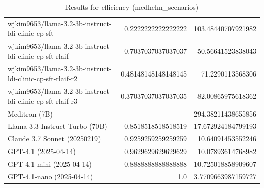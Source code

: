 \begin{table}[htp]
{\begin{tabular}{lrr}
wjkim9653/llama-3.2-3b-instruct-ldi-clinic-cp-sft & 0.2222222222222222 & 103.48440707921982 \\
wjkim9653/llama-3.2-3b-instruct-ldi-clinic-cp-sft-rlaif & 0.7037037037037037 & 50.56641523838043 \\
wjkim9653/llama-3.2-3b-instruct-ldi-clinic-cp-sft-rlaif-r2 & 0.48148148148148145 & 71.2290113568306 \\
wjkim9653/llama-3.2-3b-instruct-ldi-clinic-cp-sft-rlaif-r3 & 0.37037037037037035 & 82.00865975618362 \\
Meditron (7B) &  & 294.38211438655856 \\
Llama 3.3 Instruct Turbo (70B) & 0.8518518518518519 & 17.672924184799193 \\
Claude 3.7 Sonnet (20250219) & 0.9259259259259259 & 10.64091453552246 \\
GPT-4.1 (2025-04-14) & 0.9629629629629629 & 10.07893614768982 \\
GPT-4.1-mini (2025-04-14) & 0.8888888888888888 & 10.725018858909607 \\
GPT-4.1-nano (2025-04-14) & 1.0 & 3.7709663987159727 \\
\bottomrule
\end{tabular}}
\caption{Results for efficiency (medhelm_scenarios)}
\label{fig:efficiency (medhelm_scenarios)}
\end{table}
